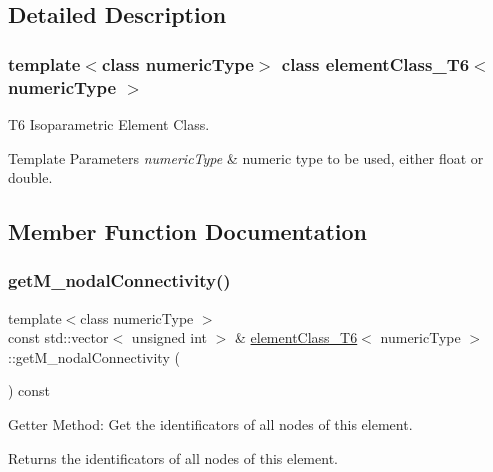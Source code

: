 \subsection{Detailed Description}
\subsubsection*{template$<$class numeric\+Type$>$\newline
class element\+Class\+\_\+\+T6$<$ numeric\+Type $>$}

T6 Isoparametric Element Class. 
\begin{DoxyTemplParams}{Template Parameters}
{\em numeric\+Type} & numeric type to be used, either float or double. \\
\hline
\end{DoxyTemplParams}


\subsection{Member Function Documentation}
\mbox{\label{classelement_class___t6_aee26f002dd5cc8d34f03e7ef008a7208}} 
\subsubsection{\texorpdfstring{get\+M\+\_\+nodal\+Connectivity()}{getM\_nodalConnectivity()}}
{\footnotesize\ttfamily template$<$class numeric\+Type $>$ \\
const std\+::vector$<$ unsigned int $>$ \& \mbox{\hyperlink{classelement_class___t6}{element\+Class\+\_\+\+T6}}$<$ numeric\+Type $>$\+::get\+M\+\_\+nodal\+Connectivity (\begin{DoxyParamCaption}{ }\end{DoxyParamCaption}) const}

Getter Method\+: Get the identificators of all nodes of this element. \begin{DoxyReturn}{Returns}
the identificators of all nodes of this element. 
\end{DoxyReturn}
\mbox{\label{classelement_class___t6_a03adb5b9a48edd11f48d1749e388ab40}} 

